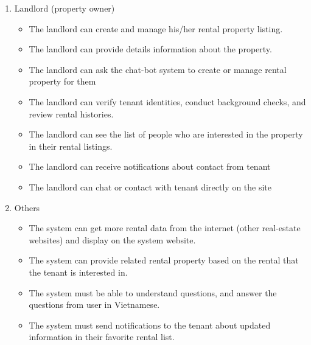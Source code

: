 \begin{enumerate}
    \item Landlord (property owner)
    \begin{itemize}
        \item The landlord can create and manage his/her rental property listing.
        \item The landlord can provide details information about the property.
        \item The landlord can ask the chat-bot system to create or manage rental property for them
        \item The landlord can verify tenant identities, conduct background checks, and review rental histories.
        \item The landlord can see the list of people who are interested in the property in their rental listings.
        \item The landlord can receive notifications about contact from tenant
        \item The landlord can chat or contact with tenant directly on the site
    \end{itemize}
    \item Others
    \begin{itemize}
        \item The system can get more rental data from the internet (other real-estate websites) and display on the system website.
        \item The system can provide related rental property based on the rental that the tenant is interested in.
        \item The system must be able to understand questions, and answer the questions from user in Vietnamese.
        \item The system must send notifications to the tenant about updated information in their favorite rental list.
    \end{itemize}
\end{enumerate}


